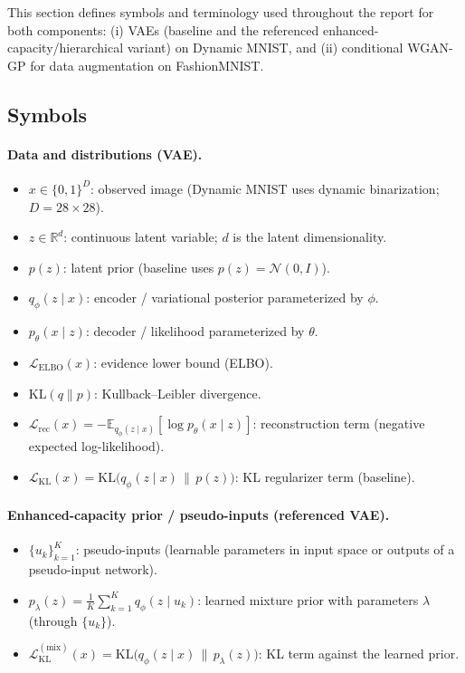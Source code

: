 This section defines symbols and terminology used throughout the report for both components:
(i) VAEs (baseline and the referenced enhanced-capacity/hierarchical variant) on Dynamic MNIST, and
(ii) conditional WGAN-GP for data augmentation on FashionMNIST.

\subsection{Symbols}

\paragraph{Data and distributions (VAE).}
\begin{itemize}
  \item $x \in \{0,1\}^{D}$: observed image (Dynamic MNIST uses dynamic binarization; $D=28\times 28$).
  \item $z \in \mathbb{R}^{d}$: continuous latent variable; $d$ is the latent dimensionality.
  \item $p(z)$: latent prior (baseline uses $p(z)=\mathcal{N}(0,I)$).
  \item $q_\phi(z\mid x)$: encoder / variational posterior parameterized by $\phi$.
  \item $p_\theta(x\mid z)$: decoder / likelihood parameterized by $\theta$.
  \item $\mathcal{L}_{\mathrm{ELBO}}(x)$: evidence lower bound (ELBO).
  \item $\mathrm{KL}(q\|p)$: Kullback--Leibler divergence.
  \item $\mathcal{L}_{\mathrm{rec}}(x) = -\mathbb{E}_{q_\phi(z\mid x)}[\log p_\theta(x\mid z)]$: reconstruction term (negative expected log-likelihood).
  \item $\mathcal{L}_{\mathrm{KL}}(x)=\mathrm{KL}\!\bigl(q_\phi(z\mid x)\,\|\,p(z)\bigr)$: KL regularizer term (baseline).
\end{itemize}

\paragraph{Enhanced-capacity prior / pseudo-inputs (referenced VAE).}
\begin{itemize}
  \item $\{u_k\}_{k=1}^K$: pseudo-inputs (learnable parameters in input space or outputs of a pseudo-input network).
  \item $p_\lambda(z)=\frac{1}{K}\sum_{k=1}^K q_\phi(z\mid u_k)$: learned mixture prior with parameters $\lambda$ (through $\{u_k\}$).
  \item $\mathcal{L}_{\mathrm{KL}}^{(\mathrm{mix})}(x)=\mathrm{KL}\!\bigl(q_\phi(z\mid x)\,\|\,p_\lambda(z)\bigr)$: KL term against the learned prior.
\end{itemize}


